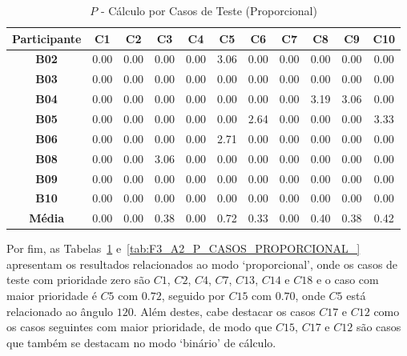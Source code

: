 \begin{table}[htbp]
	\centering
	\caption{$P$ - Cálculo por Casos de Teste (Proporcional)}
	\begin{tabular}{|c|c|c|c|c|c|c|c|c|c|c|}
		\hline
		\rowcolor[HTML]{D9D9D9} 
		\cellcolor[HTML]{D0CECE}\textbf{Participante} & \textbf{C1} & \textbf{C2} & \textbf{C3} & \textbf{C4} & \textbf{C5} & \textbf{C6} & \textbf{C7} & \textbf{C8} & \textbf{C9} & \textbf{C10} \\ \hline
		\textbf{B02} & 0.00 & 0.00 & 0.00 & 0.00 & 3.06 & 0.00 & 0.00 & 0.00 & 0.00 & 0.00 \\ \hline
		\rowcolor[HTML]{F2F2F2} 
		\textbf{B03} & 0.00 & 0.00 & 0.00 & 0.00 & 0.00 & 0.00 & 0.00 & 0.00 & 0.00 & 0.00 \\ \hline
		\textbf{B04} & 0.00 & 0.00 & 0.00 & 0.00 & 0.00 & 0.00 & 0.00 & 3.19 & 3.06 & 0.00 \\ \hline
		\rowcolor[HTML]{F2F2F2} 
		\textbf{B05} & 0.00 & 0.00 & 0.00 & 0.00 & 0.00 & 2.64 & 0.00 & 0.00 & 0.00 & 3.33 \\ \hline
		\textbf{B06} & 0.00 & 0.00 & 0.00 & 0.00 & 2.71 & 0.00 & 0.00 & 0.00 & 0.00 & 0.00 \\ \hline
		\rowcolor[HTML]{F2F2F2} 
		\textbf{B08} & 0.00 & 0.00 & 3.06 & 0.00 & 0.00 & 0.00 & 0.00 & 0.00 & 0.00 & 0.00 \\ \hline
		\textbf{B09} & 0.00 & 0.00 & 0.00 & 0.00 & 0.00 & 0.00 & 0.00 & 0.00 & 0.00 & 0.00 \\ \hline
		\rowcolor[HTML]{F2F2F2} 
		\textbf{B10} & 0.00 & 0.00 & 0.00 & 0.00 & 0.00 & 0.00 & 0.00 & 0.00 & 0.00 & 0.00 \\ \hline
		\rowcolor[HTML]{D0CECE} 
		\textbf{Média} & 0.00 & 0.00 & 0.38 & 0.00 & 0.72 & 0.33 & 0.00 & 0.40 & 0.38 & 0.42 \\ \hline
	\end{tabular}
	\label{tab:F3_A2_P_CASOS_PROPORCIONAL}
\end{table}

Por fim, as Tabelas~\ref{tab:F3_A2_P_CASOS_PROPORCIONAL} e~\ref{tab:F3_A2_P_CASOS_PROPORCIONAL_} apresentam os resultados relacionados ao modo `proporcional', onde os casos de teste com prioridade zero são $C1$, $C2$, $C4$, $C7$, $C13$, $C14$ e $C18$ e o caso com maior prioridade é $C5$ com $0.72$, seguido por $C15$ com $0.70$, onde $C5$ está relacionado ao ângulo $120$. Além destes, cabe destacar os casos $C17$ e $C12$ como os casos seguintes com maior prioridade, de modo que $C15$, $C17$ e $C12$ são casos que também se destacam no modo `binário' de cálculo.

